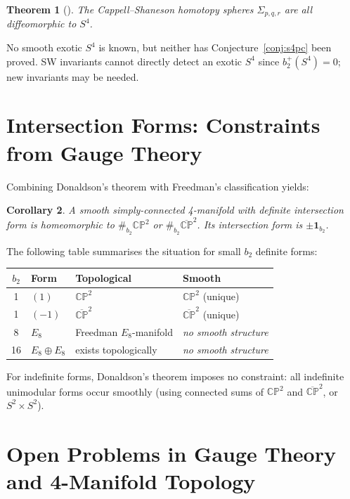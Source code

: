 \documentclass[12pt,a4paper]{amsart}
\newtheorem{theorem}{Theorem}[section]
\newtheorem{corollary}[theorem]{Corollary}
\theoremstyle{definition}
\theoremstyle{remark}
\newcommand{\CP}{\mathbb{CP}}
\begin{document}
\begin{theorem}[\cite{AkbulutKirby1979}]
The Cappell--Shaneson homotopy spheres $\Sigma_{p,q,r}$ are all
diffeomorphic to $S^4$.
\end{theorem}

No smooth exotic $S^4$ is known, but neither has Conjecture~\ref{conj:s4pc}
been proved.  SW invariants cannot directly detect an exotic $S^4$ since
$b_2^+(S^4) = 0$; new invariants may be needed.

\section{Intersection Forms: Constraints from Gauge Theory}

Combining Donaldson's theorem with Freedman's classification yields:

\begin{corollary}
A smooth simply-connected 4-manifold with definite intersection form is
homeomorphic to $\#_{b_2} \CP^2$ or $\#_{b_2} \overline{\CP}^2$.  Its
intersection form is $\pm \mathbf{1}_{b_2}$.
\end{corollary}

The following table summarises the situation for small $b_2$ definite forms:

\begin{center}
\begin{tabular}{clll}
\toprule
$b_2$ & Form & Topological & Smooth \\
\midrule
1 & $(1)$ & $\CP^2$ & $\CP^2$ (unique) \\
1 & $(-1)$ & $\overline{\CP}^2$ & $\overline{\CP}^2$ (unique) \\
8 & $E_8$ & Freedman $E_8$-manifold & \emph{no smooth structure} \\
16 & $E_8 \oplus E_8$ & exists topologically & \emph{no smooth structure} \\
\bottomrule
\end{tabular}
\end{center}

For indefinite forms, Donaldson's theorem imposes no constraint: all
indefinite unimodular forms occur smoothly (using connected sums of $\CP^2$
and $\overline{\CP}^2$, or $S^2 \times S^2$).

\section{Open Problems in Gauge Theory and 4-Manifold Topology}
\end{document}
